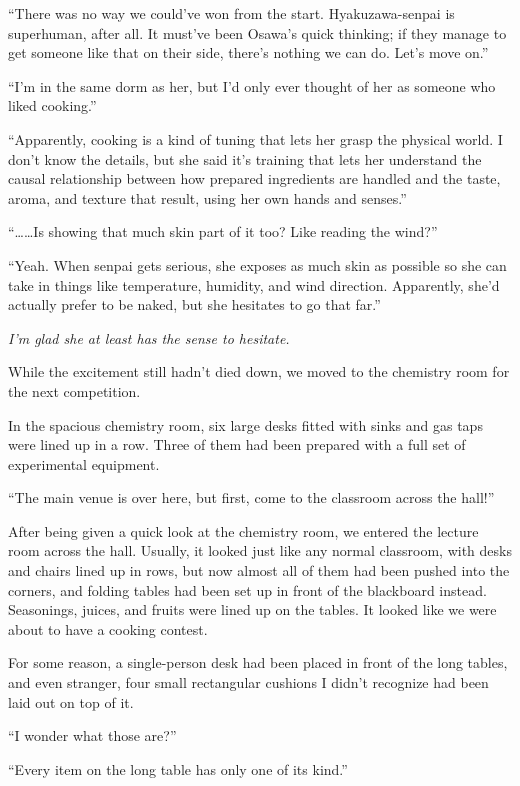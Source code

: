 \documentclass[
    a4paper,
    12pt,
    twoside,
    openany,
    UTF8,
    fontset=windows
]{ctexbook}
\begin{document}
``There was no way we could've won from the start. Hyakuzawa-senpai is superhuman, after all. It must've been Osawa's quick thinking; if they manage to get someone like that on their side, there's nothing we can do. Let's move on.''

``I'm in the same dorm as her, but I'd only ever thought of her as someone who liked cooking.''

``Apparently, cooking is a kind of tuning that lets her grasp the physical world. I don't know the details, but she said it's training that lets her understand the causal relationship between how prepared ingredients are handled and the taste, aroma, and texture that result, using her own hands and senses.''

``\dots\dots Is showing that much skin part of it too? Like reading the wind?''

``Yeah. When senpai gets serious, she exposes as much skin as possible so she can take in things like temperature, humidity, and wind direction. Apparently, she'd actually prefer to be naked, but she hesitates to go that far.''

\textit{I'm glad she at least has the sense to hesitate.}

While the excitement still hadn't died down, we moved to the chemistry room for the next competition.

In the spacious chemistry room, six large desks fitted with sinks and gas taps were lined up in a row. Three of them had been prepared with a full set of experimental equipment.

``The main venue is over here, but first, come to the classroom across the hall!''

After being given a quick look at the chemistry room, we entered the lecture room across the hall. Usually, it looked just like any normal classroom, with desks and chairs lined up in rows, but now almost all of them had been pushed into the corners, and folding tables had been set up in front of the blackboard instead. Seasonings, juices, and fruits were lined up on the tables. It looked like we were about to have a cooking contest.

For some reason, a single-person desk had been placed in front of the long tables, and even stranger, four small rectangular cushions I didn't recognize had been laid out on top of it.

``I wonder what those are?''

``Every item on the long table has only one of its kind.''
\end{document}
